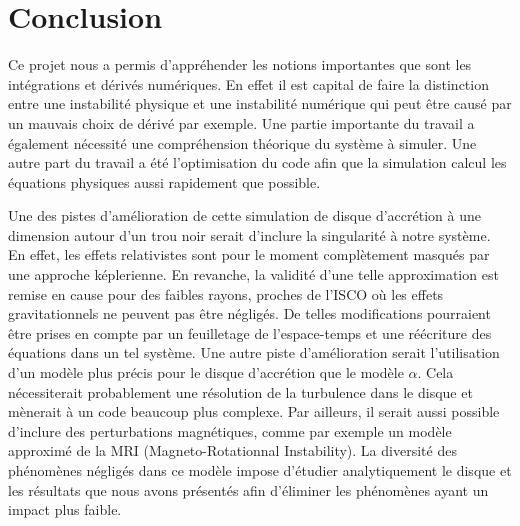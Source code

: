 \section*{Conclusion}

Ce projet nous a permis d'appréhender les notions importantes que sont les intégrations et dérivés numériques. En effet il est capital de faire la distinction entre une instabilité physique et une instabilité numérique qui peut être causé par un mauvais choix de dérivé par exemple. Une partie importante du travail a également nécessité une compréhension théorique du système à simuler. Une autre part du travail a été l'optimisation du code afin que la simulation calcul les équations physiques aussi rapidement que possible.

Une des pistes d'amélioration de cette simulation de disque d’accrétion à une dimension autour d'un trou noir serait d'inclure la singularité à notre système. En effet, les effets relativistes sont pour le moment complètement masqués par une approche képlerienne. En revanche, la validité d'une telle approximation est remise en cause pour des faibles rayons, proches de l'ISCO où les effets gravitationnels ne peuvent pas être négligés. De telles modifications pourraient être prises en compte par un feuilletage de l'espace-temps et une réécriture des équations dans un tel système. Une autre piste d'amélioration serait l'utilisation d'un modèle plus précis pour le disque d'accrétion que le modèle $\alpha$. Cela nécessiterait probablement une résolution de la turbulence dans le disque et mènerait à un code beaucoup plus complexe. Par ailleurs, il serait aussi possible d'inclure des perturbations magnétiques, comme par exemple un modèle approximé de la MRI (Magneto-Rotationnal Instability). La diversité des phénomènes négligés dans ce modèle impose d'étudier analytiquement le disque et les résultats que nous avons présentés afin d'éliminer les phénomènes ayant un impact plus faible. 
